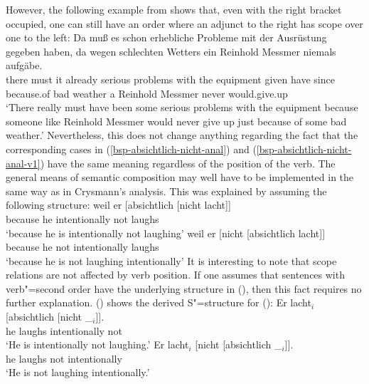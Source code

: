 \begin{enumerate}
{{}
\zl
However, the following example from \citet[]{Crysmann2004a} shows that, even with the right bracket occupied, one can still have an
order where an adjunct to the right has scope over one to the left:
\ea
\gll Da muß es schon erhebliche Probleme mit der Ausrüstung gegeben haben, da wegen schlechten
  Wetters ein Reinhold Messmer niemals aufgäbe.\\
  there must it already serious problems with the equipment given have since because.of bad weather a Reinhold Messmer never
  would.give.up\\
 \glt `There really must have been some serious problems with the equipment because someone like Reinhold Messmer would never give
  up just because of some bad weather.'
\z
Nevertheless, this does not change anything regarding the fact that the corresponding cases in (\ref{bsp-absichtlich-nicht-anal}) 
and (\ref{bsp-absichtlich-nicht-anal-v1}) have the same meaning regardless of the position of the verb. The general means of semantic
composition may well have to be implemented in the same way as in Crysmann's analysis.%
}
This was explained by assuming the following structure:
\eal
\label{bsp-absichtlich-nicht-anal}
\ex 
\gll weil er [absichtlich [nicht lacht]]\\
	 because he \spacebr{}intentionally \spacebr{}not laughs\\
\glt `because he is intentionally not laughing'
\ex 
\gll weil er [nicht [absichtlich lacht]]\\
     because he \spacebr{}not \spacebr{}intentionally laughs\\
\glt `because he is not laughing intentionally'
\zl
It is interesting to note that scope relations are not affected by verb position. If one assumes that sentences with verb"=second
order have the underlying structure in (), then this fact requires no further explanation. () shows
the derived S"=structure for ():
\eal
\label{bsp-absichtlich-nicht-anal-v1}
\ex 
\gll Er lacht$_i$ [absichtlich [nicht \_$_i$]].\\
     he laughs \spacebr{}intentionally \spacebr{}not\\
\glt `He is intentionally not laughing.'
\ex 
\gll Er lacht$_i$  [nicht [absichtlich \_$_i$]].\\
     he laughs \spacebr{}not \spacebr{}intentionally\\
\glt `He is not laughing intentionally.'
\zl{}
\nocite{Hoehle88a,Hoehle97a}
\end{enumerate}

